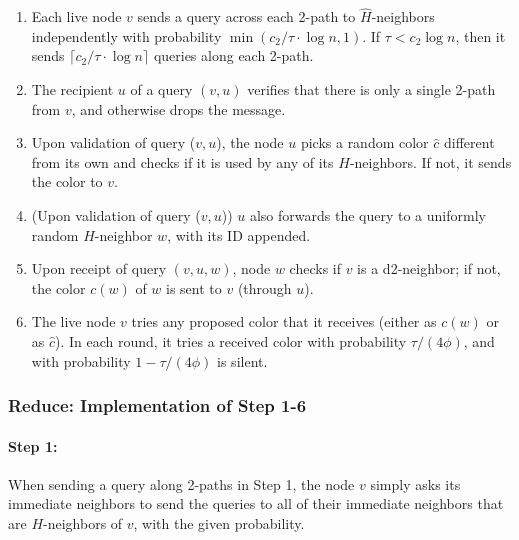 \begin{enumerate}
\itemsep0em 
  \item Each live node $v$ sends a query across each 2-path to $\hat{H}$-neighbors independently with probability $\min(c_2/\tau \cdot \log n, 1)$. If $\tau < c_2\log n$, then it sends $\lceil c_2/\tau \cdot \log n\rceil$ queries along each 2-path.
  \item The recipient $u$ of a query $(v,u)$ verifies that there is only a single 2-path from $v$, and otherwise drops the message.
  \item Upon validation of query ($v,u$), the node $u$ picks a random color $\hat{c}$ different from its own and checks if it is used by any of its $H$-neighbors. If not, it sends the color to $v$.
  \item (Upon validation of query ($v,u$)) $u$ also forwards the query to a uniformly random $H$-neighbor $w$, with its ID appended.
  \item Upon receipt of query $(v,u,w)$, node $w$ checks if $v$ is a d2-neighbor; if not, the color $c(w)$ of $w$ is sent to $v$ (through $u$).
  \item The live node $v$ tries any proposed color that it receives (either as $c(w)$ or as $\hat{c}$). In each round, it tries a received color with probability $\tau/(4\phi)$, and with probability $1-\tau/(4\phi)$ is silent.
  \end{enumerate}
\bigskip

\subsubsection{Reduce: Implementation of Step 1-6}
\paragraph{Step 1:}
When sending a query along 2-paths in Step 1, the node $v$ simply asks its immediate neighbors to send the queries to all of their immediate neighbors that are $H$-neighbors of $v$, with the given probability.
